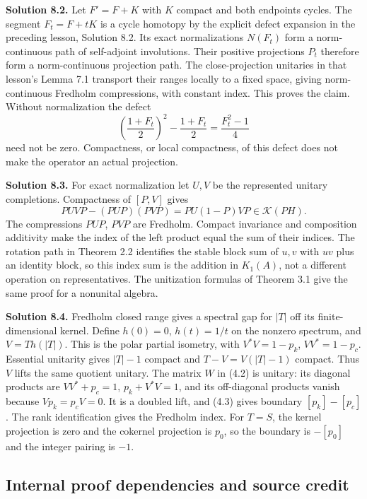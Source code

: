 \documentclass[
  11pt,
]{article}
\begin{document}
\textbf{Solution 8.2.} Let \(F'=F+K\) with \(K\) compact and both
endpoints cycles. The segment \(F_t=F+tK\) is a cycle homotopy by the
explicit defect expansion in the preceding lesson, Solution 8.2. Its
exact normalizations \(N(F_t)\) form a norm-continuous path of
self-adjoint involutions. Their positive projections \(P_t\) therefore
form a norm-continuous projection path. The close-projection unitaries
in that lesson's Lemma 7.1 transport their ranges locally to a fixed
space, giving norm-continuous Fredholm compressions, with constant
index. This proves the claim. Without normalization the defect \[
\left(\frac{1+F_t}{2}\right)^2-\frac{1+F_t}{2}
=\frac{F_t^2-1}{4}
\] need not be zero. Compactness, or local compactness, of this defect
does not make the operator an actual projection.

\textbf{Solution 8.3.} For exact normalization let \(U,V\) be the
represented unitary completions. Compactness of \([P,V]\) gives \[
PUVP-(PUP)(PVP)=PU(1-P)VP\in\mathcal K(PH).
\] The compressions \(PUP\), \(PVP\) are Fredholm. Compact invariance
and composition additivity make the index of the left product equal the
sum of their indices. The rotation path in Theorem 2.2 identifies the
stable block sum of \(u,v\) with \(uv\) plus an identity block, so this
index sum is the addition in \(K_1(A)\), not a different operation on
representatives. The unitization formulas of Theorem 3.1 give the same
proof for a nonunital algebra.

\textbf{Solution 8.4.} Fredholm closed range gives a spectral gap for
\(|T|\) off its finite-dimensional kernel. Define \(h(0)=0\),
\(h(t)=1/t\) on the nonzero spectrum, and \(V=Th(|T|)\). This is the
polar partial isometry, with \(V^*V=1-p_k\), \(VV^*=1-p_c\). Essential
unitarity gives \(|T|-1\) compact and \(T-V=V(|T|-1)\) compact. Thus
\(V\) lifts the same quotient unitary. The matrix \(W\) in (4.2) is
unitary: its diagonal products are \(VV^*+p_c=1\), \(p_k+V^*V=1\), and
its off-diagonal products vanish because \(Vp_k=p_cV=0\). It is a
doubled lift, and (4.3) gives boundary \([p_k]-[p_c]\). The rank
identification gives the Fredholm index. For \(T=S\), the kernel
projection is zero and the cokernel projection is \(p_0\), so the
boundary is \(-[p_0]\) and the integer pairing is \(-1\).

\subsection{Internal proof dependencies and source
credit}\label{internal-proof-dependencies-and-source-credit}
\end{document}
